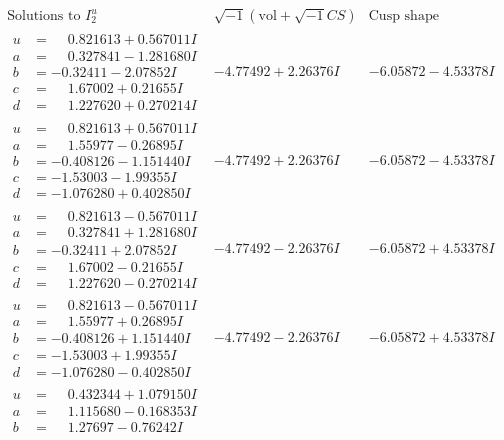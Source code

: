 \documentclass[1p]{elsarticle_modified}
\theoremstyle{definition}
\newcommand{\I}{\sqrt{-1}}
\begin{document}
$$\begin{array}{c|c|c}  
\text{Solutions to }I^u_{2}& \I (\text{vol} + \sqrt{-1}CS) & \text{Cusp shape}\\
 \hline 
\begin{aligned}
u &= \phantom{-}0.821613 + 0.567011 I \\
a &= \phantom{-}0.327841 - 1.281680 I \\
b &= -0.32411 - 2.07852 I \\
c &= \phantom{-}1.67002 + 0.21655 I \\
d &= \phantom{-}1.227620 + 0.270214 I\end{aligned}
 & -4.77492 + 2.26376 I & -6.05872 - 4.53378 I \\ \hline\begin{aligned}
u &= \phantom{-}0.821613 + 0.567011 I \\
a &= \phantom{-}1.55977 - 0.26895 I \\
b &= -0.408126 - 1.151440 I \\
c &= -1.53003 - 1.99355 I \\
d &= -1.076280 + 0.402850 I\end{aligned}
 & -4.77492 + 2.26376 I & -6.05872 - 4.53378 I \\ \hline\begin{aligned}
u &= \phantom{-}0.821613 - 0.567011 I \\
a &= \phantom{-}0.327841 + 1.281680 I \\
b &= -0.32411 + 2.07852 I \\
c &= \phantom{-}1.67002 - 0.21655 I \\
d &= \phantom{-}1.227620 - 0.270214 I\end{aligned}
 & -4.77492 - 2.26376 I & -6.05872 + 4.53378 I \\ \hline\begin{aligned}
u &= \phantom{-}0.821613 - 0.567011 I \\
a &= \phantom{-}1.55977 + 0.26895 I \\
b &= -0.408126 + 1.151440 I \\
c &= -1.53003 + 1.99355 I \\
d &= -1.076280 - 0.402850 I\end{aligned}
 & -4.77492 - 2.26376 I & -6.05872 + 4.53378 I \\ \hline\begin{aligned}
u &= \phantom{-}0.432344 + 1.079150 I \\
a &= \phantom{-}1.115680 - 0.168353 I \\
b &= \phantom{-}1.27697 - 0.76242 I \\

\end{aligned}
\end{array}$$
\end{document}
